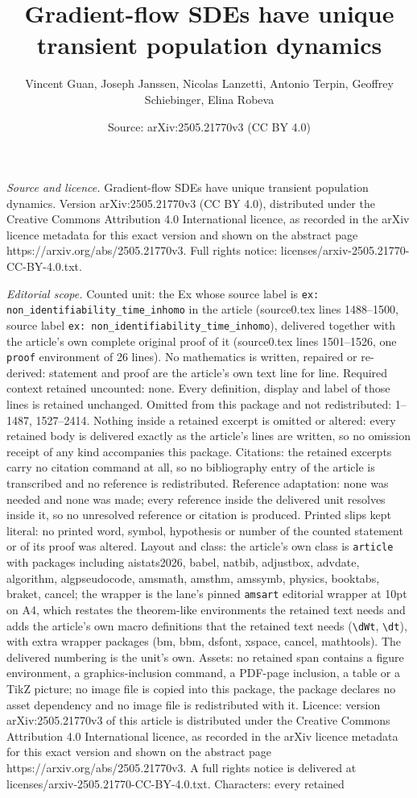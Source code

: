 \documentclass[10pt,a4paper]{amsart}
\title[Gradient-flow SDEs have unique transient population dynamics]{Gradient-flow SDEs have unique transient population dynamics}
\author{Vincent Guan, Joseph Janssen, Nicolas Lanzetti, Antonio Terpin, Geoffrey Schiebinger, Elina Robeva}
\date{Source: arXiv:2505.21770v3 (CC BY 4.0)}
\begin{document}
\maketitle

\noindent\emph{Source and licence.} Gradient-flow SDEs have unique transient population dynamics. Version arXiv:2505.21770v3 (CC BY 4.0), distributed under the Creative Commons Attribution 4.0 International licence, as recorded in the arXiv licence metadata for this exact version and shown on the abstract page https://arxiv.org/abs/2505.21770v3. Full rights notice: licenses/arxiv-2505.21770-CC-BY-4.0.txt.\par\smallskip

\noindent\textit{Editorial scope.} Counted unit: the Ex whose source label is \texttt{ex: non\_identifiability\_time\_inhomo} in the article (source0.tex lines 1488--1500, source label \texttt{ex: non\_identifiability\_time\_inhomo}), delivered together with the article's own complete original proof of it (source0.tex lines 1501--1526, one \texttt{proof} environment of 26 lines). No mathematics is written, repaired or re-derived: statement and proof are the article's own text line for line. Required context retained uncounted: none. Every definition, display and label of those lines is retained unchanged. Omitted from this package and not redistributed: 1--1487, 1527--2414. Nothing inside a retained excerpt is omitted or altered: every retained body is delivered exactly as the article's lines are written, so no omission receipt of any kind accompanies this package. Citations: the retained excerpts carry no citation command at all, so no bibliography entry of the article is transcribed and no reference is redistributed. Reference adaptation: none was needed and none was made; every reference inside the delivered unit resolves inside it, so no unresolved reference or citation is produced. Printed slips kept literal: no printed word, symbol, hypothesis or number of the counted statement or of its proof was altered. Layout and class: the article's own class is \texttt{article} with packages including aistats2026, babel, natbib, adjustbox, advdate, algorithm, algpseudocode, amsmath, amsthm, amssymb, physics, booktabs, braket, cancel; the wrapper is the lane's pinned \texttt{amsart} editorial wrapper at 10pt on A4, which restates the theorem-like environments the retained text needs and adds the article's own macro definitions that the retained text needs (\texttt{\textbackslash dWt}, \texttt{\textbackslash dt}), with extra wrapper packages (bm, bbm, dsfont, xspace, cancel, mathtools). The delivered numbering is the unit's own. Assets: no retained span contains a figure environment, a graphics-inclusion command, a PDF-page inclusion, a table or a TikZ picture; no image file is copied into this package, the package declares no asset dependency and no image file is redistributed with it. Licence: version arXiv:2505.21770v3 of this article is distributed under the Creative Commons Attribution 4.0 International licence, as recorded in the arXiv licence metadata for this exact version and shown on the abstract page https://arxiv.org/abs/2505.21770v3. A full rights notice is delivered at licenses/arxiv-2505.21770-CC-BY-4.0.txt. Characters: every retained 
\end{document}

